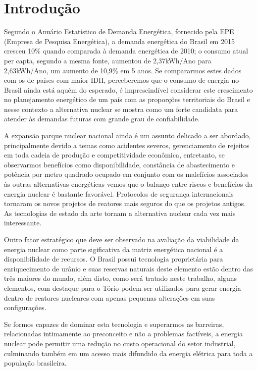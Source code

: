 \documentclass[
	12pt,				%
	openany,			%
	twoside,			%
	a4paper,			%
	english,			%
	french,				%
	spanish,			%
	brazil				%
	]{abntex2}
\begin{document}
\chapter*[Introdução]{Introdução}

Segundo o Anuário Estatístico de Demanda Energética, fornecido pela EPE (Empresa de Pesquisa Energética), a demanda energética do Brasil em 2015 cresceu 10\% quando comparada à demanda energética de 2010; o consumo atual per capta, segundo a mesma fonte, aumentou de 2,37kWh/Ano para 2,63kWh/Ano, um aumento de 10,9\% em 5 anos\cite{11anuario}. Se compararmos estes dados com os de países com maior IDH, perceberemos que o consumo de energia no Brasil ainda está aquém do esperado, é imprescindível considerar este crescimento no planejamento energético de um país com as proporções territoriais do Brasil e nesse contexto a alternativa
nuclear se mostra como um forte candidata para atender às demandas futuras com grande grau de confiabilidade.

A expansão parque nuclear nacional ainda é um assunto delicado a ser abordado, principalmente devido a temas como acidentes severos, gerenciamento de rejeitos em toda cadeia de produção e competitividade econômica, entretanto, se observarmos benefícios como disponibilidade, constância de abastecimento e potência por metro quadrado ocupado em conjunto com os malefícios associados às outras alternativas energéticas \cite{15Impactos1}\cite{16Impactos2} vemos que o balanço entre riscos e benefícios da energia nuclear é bastante favorável. Protocolos de segurança internacionais tornaram os novos projetos de reatores mais seguros do que os projetos antigos. As tecnologias de estado da arte tornam a alternativa nuclear cada vez mais interessante. 

Outro fator estratégico que deve ser observado na avaliação da viabilidade da energia nuclear como parte sigificativa da matriz energética nacional é a disponibilidade de recursos. O Brasil possui tecnologia proprietária para enriquecimento de urânio e suas reservas naturais deste elemento estão dentro das três maiores do mundo\cite{17survey}, além disto, como será tratado neste trabalho, alguns elementos, com destaque para o Tório podem ser utilizados para gerar energia dentro de reatores nucleares com apenas pequenas alterações em suas configurações. 

Se formos capazes de dominar esta tecnologia e superarmos as barreiras, relacionadas intimamente ao preconceito e não a problemas factíveis, a energia nuclear pode permitir uma redução no custo operacional do setor industrial, culminando também em um acesso mais difundido da energia elétrica para toda a população brasileira. 
\end{document}
